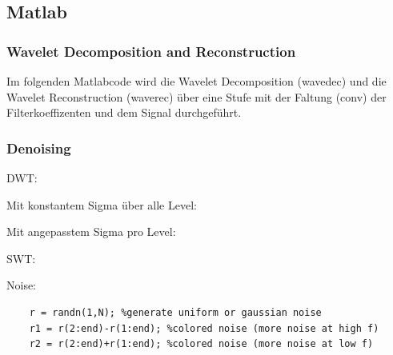\subsection{Matlab} 
\subsubsection{Wavelet Decomposition and Reconstruction}
Im folgenden Matlabcode wird die Wavelet Decomposition (wavedec) und die Wavelet Reconstruction (waverec) über eine Stufe mit der Faltung (conv) der Filterkoeffizenten und dem Signal durchgeführt.


\subsubsection{Denoising}
DWT:

Mit konstantem Sigma über alle Level:


Mit angepasstem Sigma pro Level:



SWT:

Noise:
\begin{lstlisting}
	r = randn(1,N); %generate uniform or gaussian noise
	r1 = r(2:end)-r(1:end); %colored noise (more noise at high f)
	r2 = r(2:end)+r(1:end); %colored noise (more noise at low f)
\end{lstlisting}

